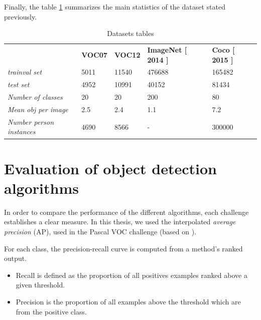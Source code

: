 Finally, the table \ref{dataset0} summarizes the main statistics of the dataset stated previously.

\begin{table}[H]
\centering

\begin{tabular}{lllll}
                                 & \textbf{VOC07} & \textbf{VOC12} & \textbf{ImageNet [ 2014 ]} & \textbf{Coco [ 2015 ]} \\
\textit{trainval set}            & 5011           & 11540          & 476688                     & 165482                 \\
\textit{test set}                & 4952           & 10991          & 40152                      & 81434                  \\
\textit{Number of classes}       & 20             & 20             & 200                        & 80                     \\
\textit{Mean obj per image}      & 2.5            & 2.4            & 1.1                        & 7.2                    \\
\textit{Number person instances} & 4690           & 8566           & -                          & 300000                
\end{tabular}
\caption{Datasets tables}
\label{dataset0}
\end{table}


\section{Evaluation of object detection algorithms}

In order to compare the performance of the different algorithms, each challenge establishes a clear measure. In this thesis, we used the interpolated \textit{average precision} (AP), used in the Pascal VOC challenge (based on \cite{salton}).

For each class, the precision-recall curve is computed from a method's ranked output.

\begin{itemize}

\item Recall is defined as the proportion of all positives examples ranked above a given threshold.

\item Precision is the proportion of all examples above the threshold which are from the positive class.

\end{itemize}


